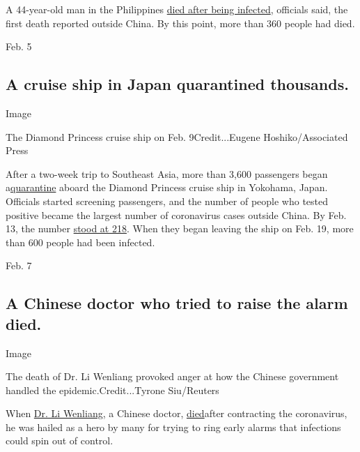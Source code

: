 A 44-year-old man in the Philippines
\href{https://www.nytimes3xbfgragh.onion/2020/02/02/world/asia/philippines-coronavirus-china.html}{died
after being infected}, officials said, the first death reported outside
China. By this point, more than 360 people had died.

Feb. 5

\hypertarget{a-cruise-ship-in-japan-quarantined-thousands}{%
\subsection{A cruise ship in Japan quarantined
thousands.}\label{a-cruise-ship-in-japan-quarantined-thousands}}

Image

The Diamond Princess cruise ship on Feb. 9Credit...Eugene
Hoshiko/Associated Press

After a two-week trip to Southeast Asia, more than 3,600 passengers
began
a\href{https://www.nytimes3xbfgragh.onion/2020/02/05/world/asia/japan-coronavirus-cruise-ship.html}{quarantine}
aboard the Diamond Princess cruise ship in Yokohama, Japan. Officials
started screening passengers, and the number of people who tested
positive became the largest number of coronavirus cases outside China.
By Feb. 13, the number
\href{https://www.nytimes3xbfgragh.onion/2020/02/12/travel/coronavirus-cruises-travel.html}{stood
at 218}. When they began leaving the ship on Feb. 19, more than 600
people had been infected.

Feb. 7

\hypertarget{a-chinese-doctor-who-tried-to-raise-the-alarm-died}{%
\subsection{A Chinese doctor who tried to raise the alarm
died.}\label{a-chinese-doctor-who-tried-to-raise-the-alarm-died}}

Image

The death of Dr. Li Wenliang provoked anger at how the Chinese
government handled the epidemic.Credit...Tyrone Siu/Reuters

When
\href{https://www.nytimes3xbfgragh.onion/2020/02/06/world/asia/chinese-doctor-Li-Wenliang-coronavirus.html}{Dr.
Li Wenliang}, a Chinese doctor,
\href{https://www.nytimes3xbfgragh.onion/2020/02/06/world/asia/chinese-doctor-Li-Wenliang-coronavirus.html}{died}after
contracting the coronavirus, he was hailed as a hero by many for trying
to ring early alarms that infections could spin out of control.

